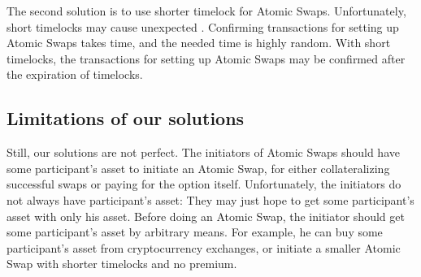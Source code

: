 The second solution is to use shorter timelock for Atomic Swaps.
Unfortunately, short timelocks may cause unexpected .
Confirming transactions for setting up Atomic Swaps takes time, and the needed time is highly random.
With short timelocks, the transactions for setting up Atomic Swaps may be confirmed after the expiration of timelocks.


\subsection{Limitations of our solutions}

Still, our solutions are not perfect.
The initiators of Atomic Swaps should have some participant's asset to initiate an Atomic Swap,
for either collateralizing successful swaps or paying for the option itself.
Unfortunately, the initiators do not always have participant's asset: They may just hope to get some participant's asset with only his asset.
Before doing an Atomic Swap, the initiator should get some participant's asset by arbitrary means.
For example, he can buy some participant's asset from cryptocurrency exchanges, or initiate a smaller Atomic Swap with shorter timelocks and no premium.